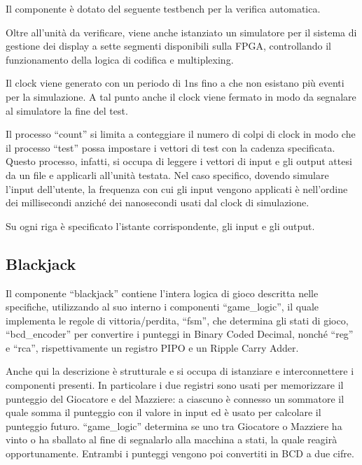 \documentclass [11pt,a4paper,oneside]{article}
\begin{document}
Il componente è dotato del seguente testbench per la verifica automatica.



Oltre all'unità da verificare, viene anche istanziato un simulatore per il
sistema di gestione dei display a sette segmenti disponibili sulla FPGA,
controllando il funzionamento della logica di codifica e multiplexing.

Il clock viene generato con un periodo di 1ns fino a che non esistano più
eventi per la simulazione. A tal punto anche il clock viene fermato in 
modo da segnalare al simulatore la fine del test.

Il processo ``count'' si limita a conteggiare il numero di colpi di clock
in modo che il processo ``test'' possa impostare i vettori di test con 
la cadenza specificata. Questo processo, infatti, si occupa di leggere
i vettori di input e gli output attesi da un file e applicarli all'unità
testata. Nel caso specifico, dovendo simulare l'input dell'utente, la
frequenza con cui gli input vengono applicati è nell'ordine dei 
millisecondi anziché dei nanosecondi usati dal clock di simulazione.



Su ogni riga è specificato l'istante corrispondente, gli input e gli
output.

\subsection{Blackjack}
Il componente ``blackjack'' contiene l'intera logica di gioco descritta
nelle specifiche, utilizzando al suo interno i componenti
``game\_logic'', il quale implementa le regole di vittoria/perdita,
``fsm'', che determina gli stati di gioco, ``bcd\_encoder'' per
convertire i punteggi in Binary Coded Decimal, nonché ``reg'' e ``rca'',
rispettivamente un registro PIPO e un Ripple Carry Adder.




Anche qui la descrizione è strutturale e si occupa di istanziare e 
interconnettere i componenti presenti. In particolare i due registri
sono usati per memorizzare il punteggio del Giocatore e del Mazziere:
a ciascuno è connesso un sommatore il quale somma il punteggio con il
valore in input ed è usato per calcolare il punteggio futuro.
``game\_logic'' determina se uno tra Giocatore o Mazziere ha vinto o
ha sballato al fine di segnalarlo alla macchina a stati, la quale
reagirà opportunamente. Entrambi i punteggi vengono poi convertiti in
BCD a due cifre.
\end{document}
